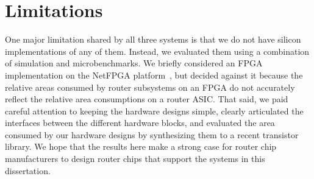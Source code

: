 \chapter{Limitations}
\label{chap:limitations}

One major limitation shared by all three systems is that we do not have silicon
implementations of any of them. Instead, we evaluated them using a combination
of simulation and microbenchmarks. We briefly considered an FPGA implementation
on the NetFPGA platform~\cite{netfpga}, but decided against it because the
relative areas consumed by router subsystems on an FPGA do not accurately
reflect the relative area consumptions on a router ASIC.  That said, we paid
careful attention to keeping the hardware designs simple, clearly articulated
the interfaces between the different hardware blocks, and evaluated the area
consumed by our hardware designs by synthesizing them to a recent transistor
library. We hope that the results here make a strong case for router chip
manufacturers to design router chips that support the systems in this
dissertation.

